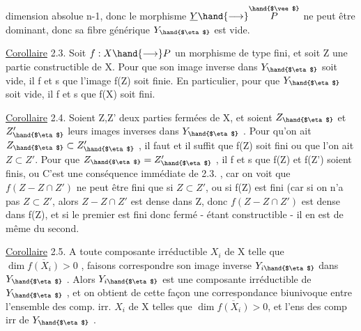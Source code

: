 
dimension absolue n-1, donc le morphisme $\underline{Y}\hand{\longrightarrow} \overset{\hand{$\vee$}}{P}$ ne peut être dominant,
donc sa fibre générique $Y_{\hand{$\eta$}}$ est vide.

\uline{Corollaire} 2.3. Soit $f:X\hand{\longrightarrow} P$ un morphisme de type fini, et soit Z une
partie constructible de X. Pour que son image inverse dans $Y_{\hand{$\eta$}}$ soit vide,
il f et s que l'image f(Z) soit finie. En particulier, pour que  $Y_{\hand{$\eta$}}$ soit
vide, il f et s que f(X) soit fini.

\uline{Corollaire} 2.4. Soient Z,Z' deux parties fermées  de X,
et soient $Z_{\hand{$\eta$}}$ et $Z'_{\hand{$\eta$}}$ leurs images inverses dans $Y_{\hand{$\eta$}}$ . Pour qu'on ait
$Z_{\hand{$\eta$}}\subset Z'_{\hand{$\eta$}}$ , il faut et il suffit que f(Z) soit fini ou que l'on ait $Z\subset Z'$.
Pour que $Z_{\hand{$\eta$}} = Z'_{\hand{$\eta$}}$ , il f et s que  f(Z) et f(Z') soient finis, ou 
 C'est une conséquence 
 immédiate de 2.3. , car on voit que $f(Z - Z\cap Z')$ ne peut être fini
que si $Z\subset Z'$, ou si f(Z) est fini (car si on n'a pas $Z\subset Z'$, alors $Z-Z\cap Z'$
est dense dans Z, donc $f(Z-Z\cap Z')$ est dense dans f(Z), et si le premier
est fini donc fermé - étant constructible - il en est de même du second.

\uline{Corollaire} 2.5. A toute composante irréductible $X_i$ de X telle que
$\dim \overline{f(X_i)} > 0$ , faisons correspondre  son image inverse $Y_{i\hand{$\eta$}}$ dans
$Y_{\hand{$\eta$}}$ . Alors $Y_{i\hand{$\eta$}}$ est une composante irréductible de $Y_{\hand{$\eta$}}$ , et on obtient de
cette façon une correspondance biunivoque entre l'ensemble des comp. irr.
$X_i$ de X telles que $\dim \overline{f(X_i)}> 0$, et l'ens des comp irr de $Y_{\hand{$\eta$}}$ .

